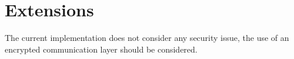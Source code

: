\chapter{Extensions}


The current implementation does not consider any security issue, the use of an encrypted communication layer should be considered.

